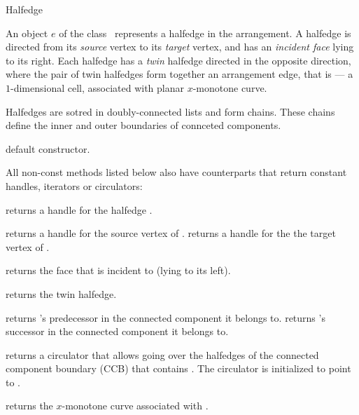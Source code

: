 
\ccRefPageBegin

\begin{ccRefClass}{Halfedge}

\ccDefinition
An object $e$ of the class \ccRefName\ represents a halfedge in the
arrangement. A halfedge is directed from its \emph{source} vertex
to its \emph{target} vertex, and has an \emph{incident face} lying to
its right. Each halfedge has a \emph{twin} halfedge directed in the
opposite direction, where the pair of twin halfedges form together
an arrangement edge, that is --- a $1$-dimensional cell, associated
with planar $x$-monotone curve.

Halfedges are sotred in doubly-connected lists and form chains. These
chains define the inner and outer boundaries of connceted components.

\ccInheritsFrom

\ccCreation
{}

   {default constructor.}    	    
    
\ccAccessFunctions

All non-const methods listed below also have  counterparts
that return constant handles, iterators or circulators:
    
    {returns a handle for the halfedge \ccVar{}.}

    {returns a handle for the source vertex of \ccVar{}.}
\ccGlue
{}
    {returns a handle for the the target vertex of \ccVar{}.}

    {returns the face that \ccVar{} is incident to (lying to its left).}

    {returns the twin halfedge.}

    {returns \ccVar{}'s predecessor in the connected component it belongs to.}
\ccGlue
{}
    {returns \ccVar{}'s successor in the connected component it belongs to.}

    {returns a circulator that allows going over the halfedges of the
     connected component boundary (CCB) that contains \ccVar{}.
     The circulator is initialized to point to \ccVar{}.}

    {returns the $x$-monotone curve associated with \ccVar{}.}

\end{ccRefClass}

\ccRefPageEnd
